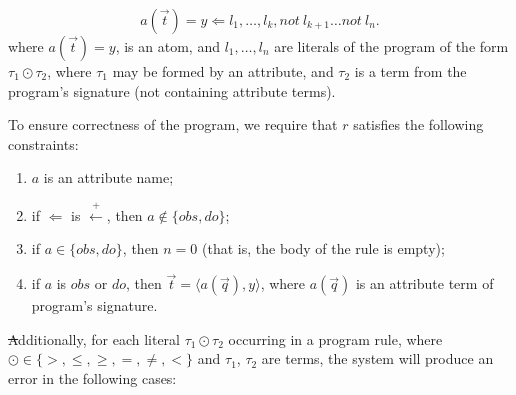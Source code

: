\documentclass[12pt, letterpaper]{article}
\begin{document}
\begin{equation}
   a(\vec{t}) = y \Leftarrow l_1,  \ldots, l_k, not~l_{k+1} \ldots not~l_{n}.
\end{equation}
where $a(\vec{t}) = y$, is an atom, and  $l_1,\ldots,l_n$ are literals of the program of the form $\tau_1 \odot \tau_2$,
where $\tau_1$ may be formed by an attribute, and $\tau_2$ is a term from the program's signature (not containing attribute terms).


\medskip\noindent
To ensure correctness of the program, we require that $r$ satisfies the following constraints:
\begin{enumerate}[label=(\arabic*),itemsep=5pt]
\item $a$ is an attribute name;
\item if $\Leftarrow$ is $\stackrel{+}{\leftarrow}$, then $a \not\in \{obs,do\}$;
\item if $a\in \{obs, do\}$, then $n=0$ (that is, the body of the rule is empty);
\item if $a$ is $obs$ or $do$, then $\vec{t} = \langle a(\vec{q}),y \rangle$, where $a(\vec{q})$ is an attribute term of program's signature.
\end{enumerate}

\st
Additionally, for each literal $\tau_1 \odot \tau_2$ occurring in a program rule, where $\odot \in \{>, \leq, \geq, =, \not=, <\}$ and $\tau_1$, $\tau_2$ are terms, the system will produce an error in the following cases:
\end{document}
